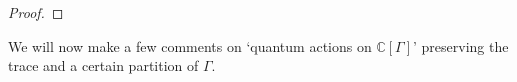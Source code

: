 \documentclass[12pt]{amsart}
\theoremstyle{definition}
\theoremstyle{definition}
\theoremstyle{definition}
\theoremstyle{definition}
\DeclareMathOperator{\Irr}{Irr}
\DeclareMathOperator{\Tr}{Tr}
\newcommand{\id}{\mathrm{id}}
\newcommand{\C}{\mathbb{C}}
\newcommand{\ol}[1]{\overline{#1}}
\numberwithin{equation}{section}
\begin{document}
\begin{proof}
\end{proof}

We will now make a few comments on  `quantum actions on $\C[\Gamma]$' preserving the trace and a certain partition of $\Gamma$.
\end{document}
